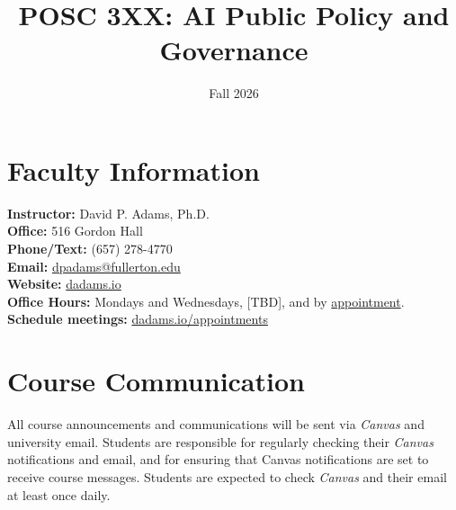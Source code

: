 \documentclass[12pt]{article}
\title{POSC 3XX: AI Public Policy and Governance}
\author{}
\date{Fall 2026}
\begin{document}
\makeatletter
\renewcommand{\maketitle}{%
    \begin{center}
        \vspace{0.75em}
        {\LARGE \@title\par}
        \vspace{0.25em}
        {\large \@date\par}
    \end{center}
    \vspace{1em}
}
\makeatother

\maketitle

\section*{Faculty Information}
\noindent \textbf{Instructor:} David P. Adams, Ph.D. \\
\noindent \textbf{Office:} 516 Gordon Hall \\
\noindent \textbf{Phone/Text:} (657) 278-4770 \\
\noindent \textbf{Email:} \href{mailto:dpadams@fullerton.edu}{dpadams@fullerton.edu} \\
\noindent \textbf{Website:} \href{https://dadams.io}{dadams.io} \\
\noindent \textbf{Office Hours:} Mondays and Wednesdays, [TBD], and by \href{https://dadams.io/appointments}{appointment}. \\
\noindent \textbf{Schedule meetings:} \href{https://dadams.io/appointments}{dadams.io/appointments}

\section*{Course Communication}
All course announcements and communications will be sent via \emph{Canvas} and university email. Students are responsible for regularly checking their \emph{Canvas} notifications and email, and for ensuring that Canvas notifications are set to receive course messages. Students are expected to check \emph{Canvas} and their email at least once daily.
\end{document}
